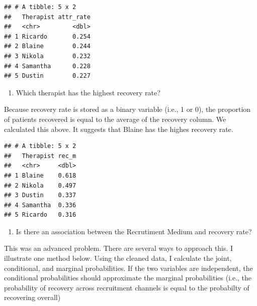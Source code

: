 \documentclass[]{book}
\newenvironment{Shaded}{\begin{snugshade}}{\end{snugshade}}
\newcommand{\KeywordTok}[1]{\textcolor[rgb]{0.13,0.29,0.53}{\textbf{#1}}}
\newcommand{\NormalTok}[1]{#1}
\newcommand{\OperatorTok}[1]{\textcolor[rgb]{0.81,0.36,0.00}{\textbf{#1}}}
\newcommand{\StringTok}[1]{\textcolor[rgb]{0.31,0.60,0.02}{#1}}
\providecommand{\tightlist}{%
  \setlength{\itemsep}{0pt}\setlength{\parskip}{0pt}}
\theoremstyle{definition}
\theoremstyle{definition}
\theoremstyle{definition}
\theoremstyle{remark}
\begin{document}
\begin{verbatim}
## # A tibble: 5 x 2
##   Therapist attr_rate
##   <chr>         <dbl>
## 1 Ricardo       0.254
## 2 Blaine        0.244
## 3 Nikola        0.232
## 4 Samantha      0.228
## 5 Dustin        0.227
\end{verbatim}

\begin{enumerate}
\def\labelenumi{\arabic{enumi}.}
\setcounter{enumi}{3}
\tightlist
\item
  Which therapist has the highest recovery rate?
\end{enumerate}

Because recovery rate is stored as a binary variable (i.e., 1 or 0), the proportion of patients recovered is equal to the average of the recovery column. We calculated this above. It suggests that Blaine has the highes recovery rate.

\begin{Shaded}
\end{Shaded}

\begin{verbatim}
## # A tibble: 5 x 2
##   Therapist rec_m
##   <chr>     <dbl>
## 1 Blaine    0.618
## 2 Nikola    0.497
## 3 Dustin    0.337
## 4 Samantha  0.336
## 5 Ricardo   0.316
\end{verbatim}

\begin{enumerate}
\def\labelenumi{\arabic{enumi}.}
\setcounter{enumi}{4}
\tightlist
\item
  Is there an association between the Recrutiment Medium and recovery rate?
\end{enumerate}

This was an advanced problem. There are several ways to approach this. I illustrate one method below. Using the cleaned data, I calculate the joint, conditional, and marginal probabilities. If the two variables are independent, the conditional probabilities should approximate the marginal probabilities (i.e., the probability of recovery across recruitment channels is equal to the probabilty of recovering overall)
\end{document}
